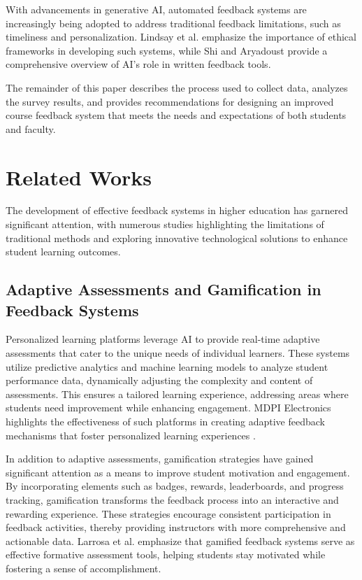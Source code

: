 \documentclass[conference]{IEEEtran}
\begin{document}
With advancements in generative AI, automated feedback systems are increasingly being adopted to address traditional feedback limitations, such as timeliness and personalization. Lindsay et al. \cite{lindsay2024responsibledevelopmentautomatedstudent} emphasize the importance of ethical frameworks in developing such systems, while Shi and Aryadoust \cite{Shi_Aryadoust_2024} provide a comprehensive overview of AI's role in written feedback tools.

The remainder of this paper describes the process used to collect data, analyzes the survey results, and provides recommendations for designing an improved course feedback system that meets the needs and expectations of both students and faculty.



\section{Related Works}

The development of effective feedback systems in higher education has garnered significant attention, with numerous studies highlighting the limitations of traditional methods and exploring innovative technological solutions to enhance student learning outcomes.

\subsection{Adaptive Assessments and Gamification in Feedback Systems}

Personalized learning platforms leverage AI to provide real-time adaptive assessments that cater to the unique needs of individual learners. These systems utilize predictive analytics and machine learning models to analyze student performance data, dynamically adjusting the complexity and content of assessments. This ensures a tailored learning experience, addressing areas where students need improvement while enhancing engagement. MDPI Electronics highlights the effectiveness of such platforms in creating adaptive feedback mechanisms that foster personalized learning experiences \cite{electronics13183762}.

In addition to adaptive assessments, gamification strategies have gained significant attention as a means to improve student motivation and engagement. By incorporating elements such as badges, rewards, leaderboards, and progress tracking, gamification transforms the feedback process into an interactive and rewarding experience. These strategies encourage consistent participation in feedback activities, thereby providing instructors with more comprehensive and actionable data. Larrosa et al. \cite{10.1007/978-981-99-7353-8_12} emphasize that gamified feedback systems serve as effective formative assessment tools, helping students stay motivated while fostering a sense of accomplishment.
\end{document}
